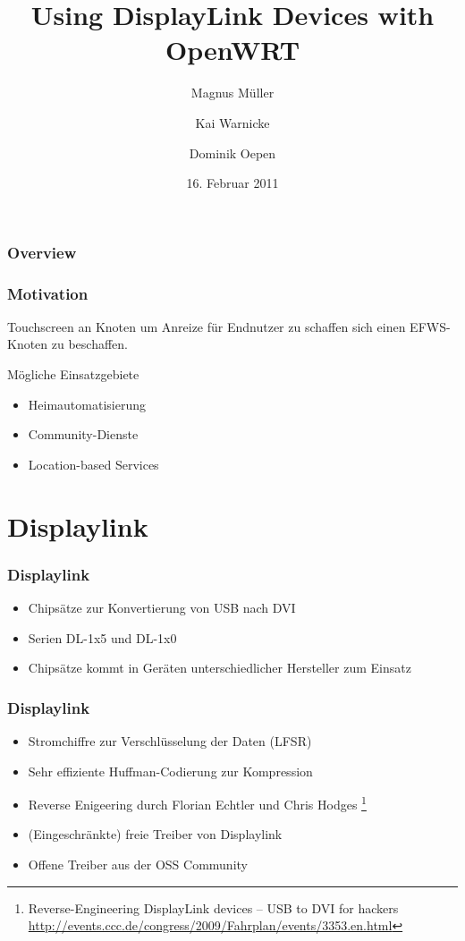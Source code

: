 \documentclass{beamer}
\title{Using DisplayLink Devices with OpenWRT}
\institute[{Humboldt-Universität zu Berlin}]{\inst{}Humboldt-Universität zu Berlin}
\author[Magnus Müller \and Kai Warnicke \and Dominik Oepen]{Magnus Müller \and Kai Warnicke \and Dominik Oepen}
\date[16.02.2011]{16. Februar 2011}
\begin{document}
	\begin{frame}
		\titlepage
	\end{frame}

	\begin{frame}
		\frametitle{Overview}
		\tableofcontents
	\end{frame}	

	\begin{frame}
		\frametitle{Motivation}
		Touchscreen an Knoten um Anreize für Endnutzer zu schaffen sich einen EFWS-Knoten zu beschaffen.\\
		\begin{block}{Mögliche Einsatzgebiete}
			\begin{itemize}
				\item Heimautomatisierung
				\item Community-Dienste
				\item Location-based Services
			\end{itemize}
		\end{block}
	\end{frame}

	\section{Displaylink}
	
	\begin{frame}
		\frametitle{Displaylink}
		\begin{itemize}
			\item Chipsätze zur Konvertierung von USB nach DVI
			\item Serien DL-1x5 und DL-1x0
			\item Chipsätze kommt in Geräten unterschiedlicher Hersteller zum Einsatz
		\end{itemize}	
	\end{frame}	
	
	\begin{frame}
		\frametitle{Displaylink}
		\begin{itemize}
			\item Stromchiffre zur Verschlüsselung der Daten (LFSR)
			\item Sehr effiziente Huffman-Codierung zur Kompression
			\item Reverse Enigeering durch Florian Echtler und Chris Hodges \footnote{Reverse-Engineering DisplayLink devices -- USB to DVI for hackers \url{http://events.ccc.de/congress/2009/Fahrplan/events/3353.en.html}}
			\item (Eingeschränkte) freie Treiber von Displaylink
			\item Offene Treiber aus der OSS Community
		\end{itemize}
	\end{frame}	
	
\end{document}
